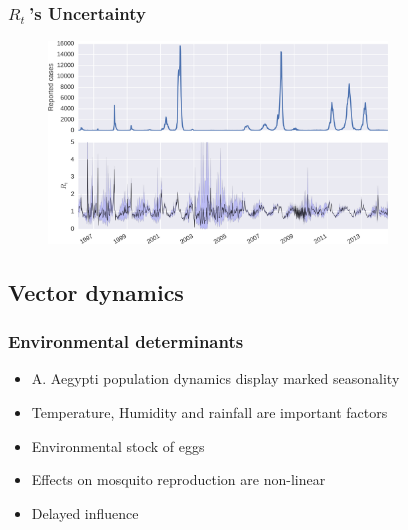 \documentclass[10pt,compress,notheorems]{beamer}
\def \rr {$R_{t}\:$}
\begin{document}
\begin{frame}
\frametitle{\rr's Uncertainty}
\begin{center}
\begin{figure}
  \includegraphics[width=9cm]{./rt_series.png}
\end{figure}
\end{center}
\end{frame}
\subsection{Vector dynamics}
\begin{frame}
\frametitle{Environmental determinants}
\begin{itemize}[<+->]
 \item A. Aegypti population dynamics display marked seasonality
 \item Temperature, Humidity and rainfall are important factors
 \item Environmental stock of eggs
 \item Effects on mosquito reproduction are non-linear
 \item Delayed influence
\end{itemize}

\end{frame}
\end{document}
